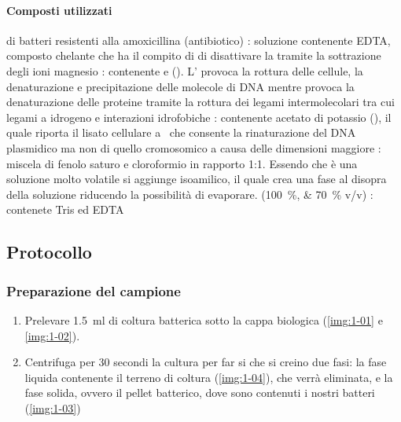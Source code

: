 \paragraph{Composti utilizzati}
\begin{itemize}[person]
	 di batteri resistenti alla amoxicillina (antibiotico)
	\itemb[\slz I]: soluzione contenente EDTA, composto chelante che ha il compito di di disattivare la  tramite la sottrazione degli ioni magnesio 
	\itemb[\slz II]: contenente  e  (). L' provoca la rottura delle cellule, la denaturazione e precipitazione delle molecole di DNA mentre  provoca la denaturazione delle proteine tramite la rottura dei legami intermolecolari tra cui legami a idrogeno e interazioni idrofobiche
	: contenente acetato di potassio (), il quale riporta il lisato cellulare a \pH\ che consente la rinaturazione del DNA plasmidico ma non di quello cromosomico a causa delle dimensioni maggiore
	: miscela di fenolo saturo e cloroformio in rapporto 1:1. Essendo che è una soluzione molto volatile si aggiunge isoamilico, il quale crea una fase al disopra della soluzione riducendo la possibilità di evaporare.
	\itemb[Etanolo] (\qtylist{100;70}{\percent} v/v)
	\itemb[\slz di TE]: contenete Tris ed EDTA
\end{itemize}

\subsection{Protocollo}
\subsubsection{Preparazione del campione}
\begin{enumerate}
	\item Prelevare \qty{1.5}{\ml} di coltura batterica sotto la cappa biologica (\autoref{img:1-01} e \ref{img:1-02}).
	\item Centrifuga per 30 secondi la cultura per far si che si creino due fasi: la fase liquida contenente il terreno di coltura (\autoref{img:1-04}), che verrà eliminata, e la fase solida, ovvero il pellet batterico, dove sono contenuti i nostri batteri (\autoref{img:1-03})
\end{enumerate}
